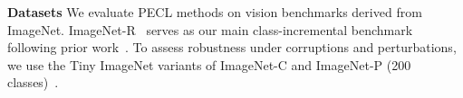 \documentclass{article}
\theoremstyle{plain}
\theoremstyle{definition}
\theoremstyle{remark}
\begin{document}



\noindent\textbf{Datasets}\quad
We evaluate PECL methods on vision benchmarks derived from ImageNet. ImageNet-R~\cite{ImagenetR_Hendrycks_2021_ICCV} serves as our main class-incremental benchmark following prior work~\cite{liangInfLoRAInterferenceFreeLowRank2024a}.
To assess robustness under corruptions and perturbations, we use the Tiny ImageNet variants of ImageNet-C and ImageNet-P (200 classes)~\cite{hendrycks2018benchmarking}.

\end{document}
